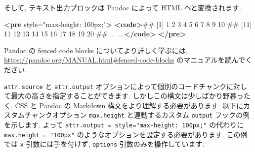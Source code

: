 \documentclass[
  11pt,
]{bxjsreport}
\newenvironment{Shaded}{\begin{snugshade}}{\end{snugshade}}
\newcommand{\KeywordTok}[1]{\textcolor[rgb]{0.13,0.29,0.53}{\textbf{#1}}}
\newcommand{\NormalTok}[1]{#1}
\newcommand{\OtherTok}[1]{\textcolor[rgb]{0.56,0.35,0.01}{#1}}
\newcommand{\StringTok}[1]{\textcolor[rgb]{0.31,0.60,0.02}{#1}}
\begin{document}
そして, テキスト出力ブロックは Pandoc によって HTML へと変換されます.

\begin{Shaded}
\begin{Highlighting}[]
\KeywordTok{\textless{}pre}\OtherTok{ style=}\StringTok{"max{-}height: 100px;"}\KeywordTok{\textgreater{}}
\KeywordTok{\textless{}code\textgreater{}}\NormalTok{\#\#   [1]   1   2   3   4   5   6   7   8   9  10}
\NormalTok{\#\#  [11]  11  12  13  14  15  16  17  18  19  20}
\NormalTok{\#\#  ... ...}\KeywordTok{\textless{}/code\textgreater{}}
\KeywordTok{\textless{}/pre\textgreater{}}
\end{Highlighting}
\end{Shaded}

Pandoc の fenced code blocks についてより詳しく学ぶには, \url{https://pandoc.org/MANUAL.html\#fenced-code-blocks} のマニュアルを読んでください.

\texttt{attr.source} と \texttt{attr.output} オプションによって個別のコードチャンクに対して最大の高さを指定することができます. しかしこの構文は少しばかり野暮ったく, CSS と Pandoc の Markdown 構文をより理解する必要があります. 以下にカスタムチャンクオプション \texttt{max.height} と連動するカスタム \texttt{output} フックの例を示します. よって \texttt{attr.output = \textquotesingle{}style="max-height:\ 100px;"\textquotesingle{}} の代わりに \texttt{max.height = "100px"} のようなオプションを設定する必要があります. この例では \texttt{x} 引数には手を付けず, \texttt{options} 引数のみを操作しています.
\end{document}
